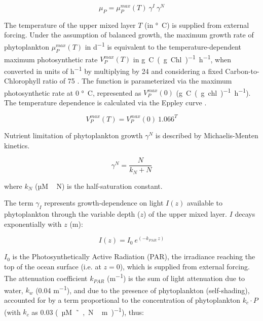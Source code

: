 \documentclass[journal abbreviation, manuscript]{copernicus}
\begin{document}
\begin{equation}
    \mu_{P} = \mu_P^{max}(T) \ \gamma^{I} \ \gamma^{N}
\end{equation}

The temperature of the upper mixed layer $T$ (in \unit{\degree C}) is supplied from external forcing. Under the assumption of balanced growth, the maximum growth rate of phytoplankton $\mu_P^{max}(T)$ in \unit{d^{−1}} is equivalent to the temperature-dependent maximum photosynthetic rate $V_P^{max}(T)$ in \unit{g C (g Chl)^{-1} h^{-1}}, when converted in units of \unit{h^{-1}} by multiplying by 24 and considering a fixed Carbon-to-Chlorophyll ratio of 75 \citep{Sathyendranath2009Carbon-to-chlorophyllSea}. The function is parameterized via the maximum photosynthetic rate at 0 \unit{\degree C}, represented as $V_P^{max}(0)$ (\unit{g C (g chl)^{-1} h^{-1}}). The temperature dependence is calculated via the Eppley curve \citep{Eppley1972TemperatureSea}.

\begin{equation}
    V_P^{max}(T) = V_P^{max}(0) \ 1.066^T
\end{equation}

Nutrient limitation of phytoplankton growth $\gamma^N$ is described by Michaelis-Menten kinetics.

\begin{equation}
    \gamma^N = \frac{N}{k_N + N}
\end{equation}

where $k_N$ (\unit{µM\,N}) is the half-saturation constant.

The term $\gamma_{I}$ represents growth-dependence on light $I(z)$ available to phytoplankton through the variable depth ($z$) of the upper mixed layer. $I$ decays exponentially with $z$ (\unit{m}):

\begin{equation}
    I(z) = I_{0} \ e^{(-k_{PAR} \ z)}
\label{EQ:lightatt}
\end{equation}

$I_{0}$ is the Photosynthetically Active Radiation (PAR), the irradiance reaching the top of the ocean surface (i.e. at $z=0$), which is supplied from external forcing. The attenuation coefficient $k_{PAR}$ (\unit{m^{-1}}) is the sum of light attenuation due to water, $k_w$ (0.04 \unit{m^{-1}}), and due to the presence of phytoplankton (self-shading), accounted for by a term proportional to the concentration of phytoplankton $k_c \cdot P$ (with $k_c$ as 0.03 \unit{(µM˜,N\,m)^{-1}}), thus:
\end{document}
